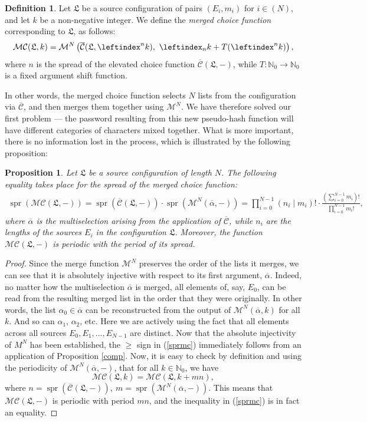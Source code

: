 \documentclass[a4paper, 10pt]{article}
\theoremstyle{plain}
\newtheorem{proposition}[theorem]{Proposition}
\theoremstyle{definition}
\newtheorem{definition}[theorem]{Definition}
\newcommand{\N}{\mathbb{N}}
\newcommand{\li}{\leftindex}
\newcommand{\rf}[2]{(#1 \mathbin{\mid} #2)!}
\newcommand{\spr}[1]{\operatorname{spr}(#1)}
\newcommand{\conf}{\mathfrak{L}}
\newcommand{\elv}{\overline{\mathcal{C}}}
\newcommand{\m}{\mathcal{M}}
\newcommand{\mc}{\mathcal{MC}}
\begin{document}
\begin{definition}
  Let $\conf$ be a source configuration of pairs $(E_i, m_i)$ for $i \in (N)$, and let $k$ be a non-negative integer. We define the \emph{merged choice function} corresponding to $\conf$, as follows:
  \[
    \mc(\conf, k) = \m^N \left( \elv(\conf, \li^n k),\ \li_n k + T(\li^n k) \right),
  \]
  where $n$ is the spread of the elevated choice function $\elv(\conf, -)$, while $T \colon \N_0 \to \N_0$ is a fixed argument shift function.\\
\end{definition}

In other words, the merged choice function selects $N$ lists from the configuration via $\elv$, and then merges them together using $\m^N$. We have therefore solved our first problem --- the password resulting from this new pseudo-hash function will have different categories of characters mixed together. What is more important, there is no information lost in the process, which is illustrated by the following proposition:\\

\begin{proposition}
  Let $\conf$ be a source configuration of length $N$. The following equality takes place for the spread of the merged choice function:
  \begin{align}
    \label{sprmc}
    \spr{\mc(\conf, -)} = \spr{\elv(\conf, -)} \cdot \spr{\m^N (\overline{\alpha}, -)} = \prod_{i = 0}^{N-1} \rf{n_i}{m_i} \cdot \frac{\left( \sum_{i = 0}^{N-1} m_i \right)!}{\prod_{i = 0}^{N-1} m_i !},
  \end{align}
  where $\overline{\alpha}$ is the multiselection arising from the application of $\elv$, while $n_i$ are the lengths of the sources $E_i$ in the configuration $\conf$. Moreover, the function $\mc(\conf, -)$ is periodic with the period of its spread.
\end{proposition}
\begin{proof}
  Since the merge function $\m^N$ preserves the order of the lists it merges, we can see that it is absolutely injective with respect to its first argument, $\overline{\alpha}$. Indeed, no matter how the multiselection $\overline{\alpha}$ is merged, all elements of, say, $E_0$, can be read from the resulting merged list in the order that they were originally. In other words, the list $\alpha_0 \in \overline{\alpha}$ can be reconstructed from the output of $\m^N (\overline{\alpha}, k)$ for all $k$. And so can $\alpha_1$, $\alpha_2$, etc. Here we are actively using the fact that all elements across all sources $E_0, E_1, ..., E_{N-1}$ are distinct. Now that the absolute injectivity of $M^N$ has been established, the $\ge$ sign in (\ref{sprmc}) immediately follows from an application of Proposition \ref{comp}. 
  Now, it is easy to check by definition and using the periodicity of $\m^N(\overline{\alpha}, -)$, that for all $k \in \N_0$, we have
  \[
    \mc(\conf, k) = \mc(\conf, k + m n),
  \]
  where $n = \spr{\elv(\conf, -)},\ m = \spr{\m^N (\overline{\alpha}, -)}$. This means that $\mc(\conf, -)$ is periodic with period $m n$, and the inequality in (\ref{sprmc}) is in fact an equality.
\end{proof}
\end{document}
